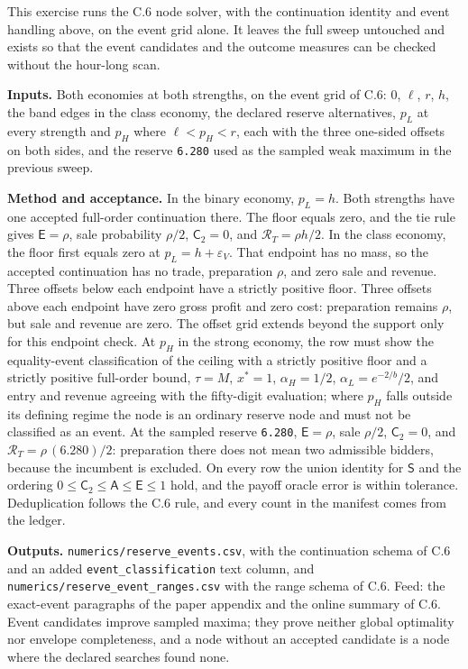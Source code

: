 \documentclass[
  11pt,
]{article}
\newcounter{none} %
\begin{document}
This exercise runs the C.6 node solver, with the continuation identity
and event handling above, on the event grid alone. It leaves the full
sweep untouched and exists so that the event candidates and the outcome
measures can be checked without the hour-long scan.

\textbf{Inputs.} Both economies at both strengths, on the event grid of
C.6: \(0\), \(\ell\), \(r\), \(h\), the band edges in the class economy,
the declared reserve alternatives, \(p_L\) at every strength and \(p_H\)
where \(\ell<p_H<r\), each with the three one-sided offsets on both
sides, and the reserve \texttt{6.280} used as the sampled weak maximum
in the previous sweep.

\textbf{Method and acceptance.} In the binary economy, \(p_L=h\). Both
strengths have one accepted full-order continuation there. The floor
equals zero, and the tie rule gives \(\mathsf E=\rho\), sale probability
\(\rho/2\), \(\mathsf C_2=0\), and \(\mathcal R_T=\rho h/2\). In the
class economy, the floor first equals zero at \(p_L=h+\varepsilon_V\).
That endpoint has no mass, so the accepted continuation has no trade,
preparation \(\rho\), and zero sale and revenue. Three offsets below
each endpoint have a strictly positive floor. Three offsets above each
endpoint have zero gross profit and zero cost: preparation remains
\(\rho\), but sale and revenue are zero. The offset grid extends beyond
the support only for this endpoint check. At \(p_H\) in the strong
economy, the row must show the equality-event classification of the
ceiling with a strictly positive floor and a strictly positive
full-order bound, \(\tau=M\), \(x^*=1\), \(\alpha_H=1/2\),
\(\alpha_L=e^{-2/b}/2\), and entry and revenue agreeing with the
fifty-digit evaluation; where \(p_H\) falls outside its defining regime
the node is an ordinary reserve node and must not be classified as an
event. At the sampled reserve \texttt{6.280}, \(\mathsf E=\rho\), sale
\(\rho/2\), \(\mathsf C_2=0\), and \(\mathcal R_T=\rho\,(6.280)/2\):
preparation there does not mean two admissible bidders, because the
incumbent is excluded. On every row the union identity for \(\mathsf S\)
and the ordering \(0\le\mathsf C_2\le\mathsf A\le\mathsf E\le1\) hold,
and the payoff oracle error is within tolerance. Deduplication follows
the C.6 rule, and every count in the manifest comes from the ledger.

\textbf{Outputs.} \texttt{numerics/reserve\_events.csv}, with the
continuation schema of C.6 and an added \texttt{event\_classification}
text column, and \texttt{numerics/reserve\_event\_ranges.csv} with the
range schema of C.6. Feed: the exact-event paragraphs of the paper
appendix and the online summary of C.6. Event candidates improve sampled
maxima; they prove neither global optimality nor envelope completeness,
and a node without an accepted candidate is a node where the declared
searches found none.
\end{document}

